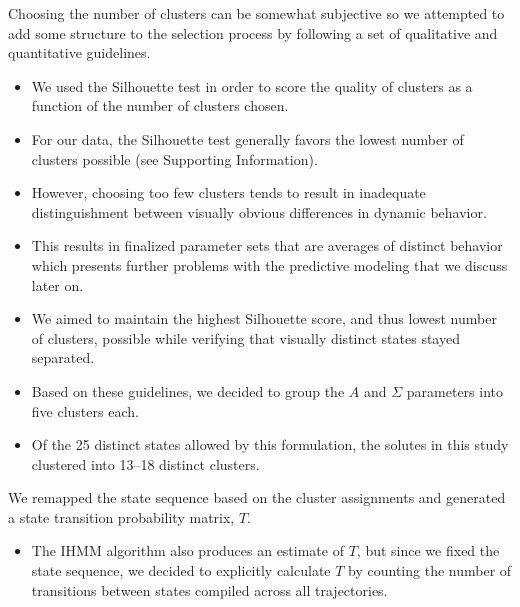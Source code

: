 \documentclass{article}
\begin{document}
  Choosing the number of clusters can be somewhat subjective so
  we attempted to add some structure to the selection process by following
  a set of qualitative and quantitative guidelines.
  \begin{itemize}
    \item We used the Silhouette test in order to score the quality of
    clusters as a function of the number of clusters chosen.
    \item For our data, the Silhouette test generally favors the lowest number
    of clusters possible (see Supporting Information).
    \item However, choosing too few clusters tends to result in 
    inadequate distinguishment between visually obvious differences in 
    dynamic behavior.
    \item This results in finalized parameter sets that are averages of
    distinct behavior which presents further problems with the predictive
    modeling that we discuss later on.
    \item We aimed to maintain the highest Silhouette score, and thus lowest
    number of clusters, possible while verifying that visually distinct 
    states stayed separated.
    \item Based on these guidelines, we decided to group the $A$ and $\Sigma$
    parameters into five clusters each. 
	\item Of the 25 distinct states allowed by this formulation, the solutes
	in this study clustered into 13--18 distinct clusters.
  \end{itemize}

  We remapped the state sequence based on the cluster assignments and
  generated a state transition probability matrix, $T$.
  \begin{itemize}
   \item The IHMM algorithm also produces an estimate of $T$, but since we 
   fixed the state sequence, we decided to explicitly calculate $T$ by 
   counting the number of transitions between states compiled across all 
   trajectories.
  \end{itemize}  
  
\end{document}
